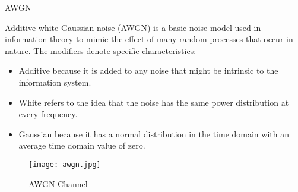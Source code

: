 \documentclass{beamer}
\begin{document}
\begin{frame}{AWGN}

Additive white Gaussian noise (AWGN) is a basic noise model used in information theory to mimic the effect of many random processes that occur in nature. The modifiers denote specific characteristics:
\begin{block}{}
\begin{itemize}
    \item Additive because it is added to any noise that might be intrinsic to the information system.
    \item White refers to the idea that the noise has the same power distribution at every frequency.
    \item Gaussian because it has a normal distribution in the time domain with an average time domain value of zero.

\end{itemize}
\end{block}
\begin{figure}
    \centering
    \texttt{[image: awgn.jpg]}
    \caption{AWGN Channel}
    \label{5}
\end{figure}
\end{frame}
\end{document}
